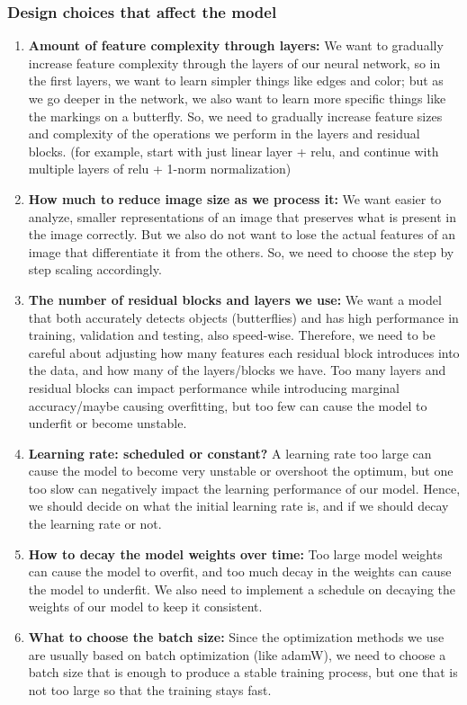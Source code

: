 \documentclass[10pt]{article} %
\begin{document}
\subsubsection{Design choices that affect the model}\begin{enumerate}
    \item \textbf{Amount of feature complexity through layers:} We want to gradually increase feature complexity through the layers of our neural network, so in the first layers, we want to learn simpler things like edges and color; but as we go deeper in the network, we also want to learn more specific things like the markings on a butterfly. So, we need to gradually increase feature sizes and complexity of the operations we perform in the layers and residual blocks. (for example, start with just linear layer + relu, and continue with multiple layers of relu + 1-norm normalization)
    \item \textbf{How much to reduce image size as we process it:} We want easier to analyze, smaller representations of an image that preserves what is present in the image correctly. But we also do not want to lose the actual features of an image that differentiate it from the others. So, we need to choose the step by step scaling accordingly.
    \item \textbf{The number of residual blocks and layers we use:} We want a model that both accurately detects objects (butterflies) and has high performance in training, validation and testing, also speed-wise. Therefore, we need to be careful about adjusting how many features each residual block introduces into the data, and how many of the layers/blocks we have. Too many layers and residual blocks can impact performance while introducing marginal accuracy/maybe causing overfitting, but too few can cause the model to underfit or become unstable.
    \item \textbf{Learning rate: scheduled or constant?} A learning rate too large can cause the model to become very unstable or overshoot the optimum, but one too slow can negatively impact the learning performance of our model. Hence, we should decide on what the initial learning rate is, and if we should decay the learning rate or not.
    \item \textbf{How to decay the model weights over time:} Too large model weights can cause the model to overfit, and too much decay in the weights can cause the model to underfit. We also need to implement a schedule on decaying the weights of our model to keep it consistent.
    \item \textbf{What to choose the batch size:} Since the optimization methods we use are usually based on batch optimization (like adamW), we need to choose a batch size that is enough to produce a stable training process, but one that is not too large so that the training stays fast.

\end{enumerate}
\end{document}
